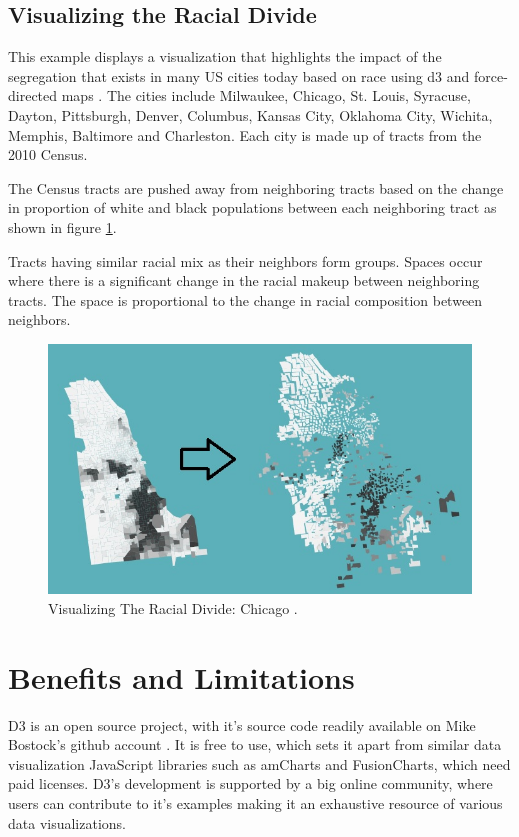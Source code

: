 \documentclass[9pt,twocolumn,twoside]{styles/osajnl}
\begin{document}
\subsection{Visualizing the Racial Divide}
This example displays a visualization that highlights the impact of the segregation that exists in many US cities today based on race using d3 and force-directed maps \cite{www-fdm}. The cities include Milwaukee, Chicago, St. Louis, Syracuse, Dayton, Pittsburgh, Denver, Columbus, Kansas City, Oklahoma City, Wichita, Memphis, Baltimore and Charleston. Each city is made up of tracts from the 2010 Census.

The Census tracts are pushed away from neighboring tracts based on the change in proportion of white and black populations between each neighboring tract as shown in figure \ref{fig:chicago}.

Tracts having similar racial mix as their neighbors form groups. Spaces occur where there is a significant change in the racial makeup between neighboring tracts. The space is proportional to the change in racial composition between neighbors. 

\begin{figure}[h]
\centering
\includegraphics[scale=0.4]{images/4}
\centering
\caption{Visualizing The Racial Divide: Chicago \cite{www-chicago}.}
\label{fig:chicago}
\end{figure}




\section{Benefits and Limitations}
D3 is an open source project, with it's source code readily available on Mike Bostock's github account \cite{www-mike}. It is free to use, which sets it apart from similar data visualization JavaScript libraries such as amCharts and FusionCharts, which need paid licenses. D3's development is supported by a big online community, where users can contribute to it's examples making it an exhaustive resource of various data visualizations. 
\end{document}
